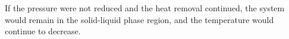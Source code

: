If the pressure were not reduced and the heat removal continued, the system would remain in the solid-liquid phase region, and the temperature would continue to decrease.